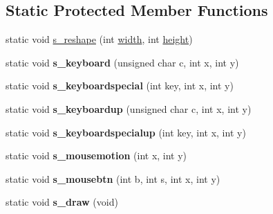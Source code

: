 \subsection*{Static Protected Member Functions}
\begin{DoxyCompactItemize}
\item 
static void \hyperlink{classimage__tools_1_1BaseGfxApp_ae80abc9298c82b1ecaf5cb34e2e69827}{s\+\_\+reshape} (int \hyperlink{classimage__tools_1_1BaseGfxApp_a2fe403c5392f624477c2ce4429f1a7b5}{width}, int \hyperlink{classimage__tools_1_1BaseGfxApp_aa961e13a7a8e6062204223cc33ac7503}{height})
\item 
static void {\bfseries s\+\_\+keyboard} (unsigned char c, int x, int y)\hypertarget{classimage__tools_1_1BaseGfxApp_a0391cb9a366eaf202281688265806793}{}\label{classimage__tools_1_1BaseGfxApp_a0391cb9a366eaf202281688265806793}

\item 
static void {\bfseries s\+\_\+keyboardspecial} (int key, int x, int y)\hypertarget{classimage__tools_1_1BaseGfxApp_a6c7127b21265296021dbaf94bbcfa505}{}\label{classimage__tools_1_1BaseGfxApp_a6c7127b21265296021dbaf94bbcfa505}

\item 
static void {\bfseries s\+\_\+keyboardup} (unsigned char c, int x, int y)\hypertarget{classimage__tools_1_1BaseGfxApp_a2831ddec48ca07c1b69dde729bee1ca5}{}\label{classimage__tools_1_1BaseGfxApp_a2831ddec48ca07c1b69dde729bee1ca5}

\item 
static void {\bfseries s\+\_\+keyboardspecialup} (int key, int x, int y)\hypertarget{classimage__tools_1_1BaseGfxApp_ab2e44362d949be917845c55735019544}{}\label{classimage__tools_1_1BaseGfxApp_ab2e44362d949be917845c55735019544}

\item 
static void {\bfseries s\+\_\+mousemotion} (int x, int y)\hypertarget{classimage__tools_1_1BaseGfxApp_a0b69e9306843ee2c4dded7577551edcc}{}\label{classimage__tools_1_1BaseGfxApp_a0b69e9306843ee2c4dded7577551edcc}

\item 
static void {\bfseries s\+\_\+mousebtn} (int b, int s, int x, int y)\hypertarget{classimage__tools_1_1BaseGfxApp_af4a7aa4ed9b3c77000835c4f42f9cc2d}{}\label{classimage__tools_1_1BaseGfxApp_af4a7aa4ed9b3c77000835c4f42f9cc2d}

\item 
static void {\bfseries s\+\_\+draw} (void)\hypertarget{classimage__tools_1_1BaseGfxApp_a4e7a162129d2b751edfedc01a9f0181b}{}\label{classimage__tools_1_1BaseGfxApp_a4e7a162129d2b751edfedc01a9f0181b}


\end{DoxyCompactItemize}
